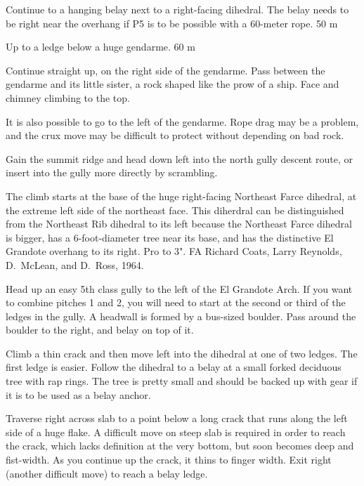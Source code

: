 \documentclass{tahquitz}
\begin{document}
 Continue to a hanging
belay next to a right-facing dihedral. The belay needs to be right near the
overhang if P5 is to be possible with a 60-meter rope. 50 m

 Up to a ledge below a huge gendarme. 60 m

 Continue straight up, on the right side of the gendarme.
Pass between the gendarme and its little sister, a rock shaped like
the prow of a ship. Face and chimney climbing to the top.

 It is also possible to go to the left of the gendarme.
Rope drag may be a problem, and the crux move may be difficult to protect
without depending on bad rock.

Gain the summit ridge and head down left into the north gully descent route,
or insert into the gully more directly by scrambling.





The climb starts at the base of the huge right-facing Northeast Farce dihedral,
at the extreme left side of the northeast face.
This diherdral can be distinguished from the Northeast Rib dihedral to its left
because the Northeast Farce dihedral is bigger, has a 6-foot-diameter tree near its base,
and has the distinctive El Grandote overhang to its right.
Pro to 3". FA Richard Coats, Larry Reynolds, D.~McLean, and D.~Ross, 1964.

 Head up an easy 5th class gully to the left of the El Grandote Arch.
If you want to combine pitches 1 and 2, you will need to start at the second or third
of the ledges in the gully. A headwall is formed by a bus-sized boulder. Pass around the boulder
to the right, and belay on top of it.

 Climb a thin crack and then move left into the dihedral at one of two ledges.
The first ledge is easier. Follow the dihedral to a belay at a small forked deciduous tree with rap
rings. The tree is pretty small and should be backed up with gear if it is to be
used as a belay anchor.

 Traverse right across slab to a point below a long crack that runs
along the left side of a huge flake. A difficult move on steep slab is required in
order to reach the crack, which lacks definition at the very bottom, but soon becomes
deep and fist-width. As you continue up the crack, it thins to finger width.
Exit right (another difficult move) to reach a belay ledge.
\end{document}
